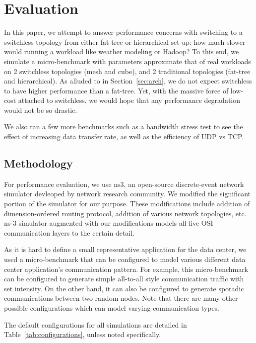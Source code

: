 \section{Evaluation}
\label{sec:eval}
In this paper, we attempt to answer performance concerns with switching to a switchless topology from either fat-tree or hierarchical set-up: how much slower would running a workload like weather modeling or Hadoop? To this end, we simulate a micro-benchmark with parameters approximate that of real workloads on 2 switchless topologies (mesh and cube), and 2 traditional topologies (fat-tree and hierarchical). As alluded to in Section~\ref{sec:arch}, we do not expect switchless to have higher performance than a fat-tree. Yet, with the massive force of low-cost attached to switchless, we would hope that any performance degradation would not be so drastic.

We also ran a few more benchmarks such as a bandwidth stress test to see the effect of increasing data transfer rate, as well as the efficiency of UDP vs TCP.

\subsection {Methodology}
For performance evaluation, we use ns3, an open-source discrete-event network simulator devleoped by network research community. We modified the significant portion of the simulator for our purpose. These modifications include addition of dimension-ordered routing protocol, addition of various network topologies, etc. ns-3 simulator augmented with our modifications models all five OSI communication layers to the certain detail.

As it is hard to define a small representative application for the data center, we used a micro-benchmark that can be configured to model various different data center application's communication pattern. For example, this micro-benchmark can be configured to generate simple all-to-all style communication traffic with set intensity. On the other hand, it can also be configured to generate sporadic communications between two random nodes. Note that there are many other possible configurations which can model varying communication types.

The default configurations for all simulations are detailed in Table~\ref{tab:configurations}, unless noted specifically.
% 

